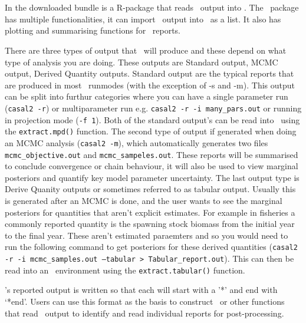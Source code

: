 \section{ \label{sec:post-processing}}

In the downloaded bundle is a R-package that reads \CNAME\ output into \R. The \CNAME\ package has multiple functionalities, it can import \CNAME\ output into \R\ as a list. It also has plotting and summarising functions for \CNAME\ reports.

There are three types of output that \CNAME\ will produce and these depend on what type of analysis you are doing. These outputs are Standard output, MCMC output, Derived Quantity outputs. Standard output are the typical reports that are produced in most \CNAME\ runmodes (with the exception of -s and -m). This output can be split into furthur categories where you can have a single parameter run (\texttt{casal2 -r}) or multiparameter run e.g. \texttt{casal2 -r -i many\_pars.out} or running in projection mode (\texttt{-f 1}). Both of the standard output's can be read into \R\ using the \texttt{extract.mpd()} function. The second type of output if generated when doing an MCMC analysis (\texttt{casal2 -m}), which automatically generates two files \texttt{mcmc\_objective.out} and \texttt{mcmc\_sampeles.out}. These reports will be summarised to conclude convergence or chain behaviour, it will also be used to view marginal posteriors and quantify key model parameter uncertainty. The last output type is Derive Quanity outputs or sometimes referred to as tabular output. Usually this is generated after an MCMC is done, and the user wants to see the marginal posteriors for quantities that aren't explicit estimates. For example in fisheries a commonly reported quantity is the spawning stock biomass from the initial year to the final year. These aren't estimated paraemters and so you would need to run the following command to get posteriors for these derived quantities (\texttt{casal2 -r -i mcmc\_samples.out --tabular > Tabular\_report.out}). This can then be read into an \R\ environment using the \texttt{extract.tabular()} function.


\CNAME's reported output is written so that each  will start with a '*' and end with `*end'. Users can use this format as the basis to construct \R\ or other functions that read \CNAME\ output to identify and read individual reports for post-processing.


